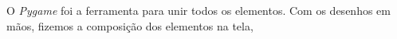 \documentclass[a4paper]{article}
\begin{document}
        O \emph{Pygame} foi a ferramenta para unir todos os elementos. Com os desenhos
        em mãos, fizemos a composição dos elementos na tela, 




        






\end{document}

